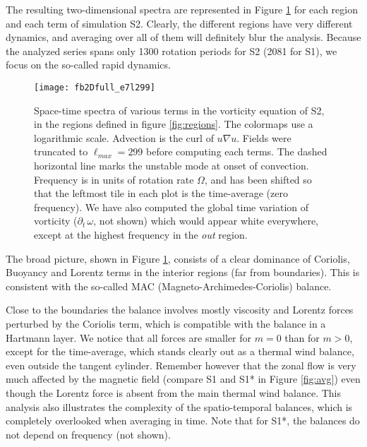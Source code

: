 \documentclass[12pt, a4paper]{article}
\begin{document}
The resulting two-dimensional spectra are represented in Figure \ref{fig:fb2d_S2} for each region and each term of simulation S2. 
Clearly, the different regions have very different dynamics, and averaging over all of them will definitely blur the analysis.
Because the analyzed series spans only 1300 rotation periods for S2 (2081 for S1), we focus on the so-called rapid dynamics.

\begin{figure}
\begin{center}
\texttt{[image: fb2Dfull\_e7l299]}
\caption{Space-time spectra of various terms in the vorticity equation of S2, in the regions defined in figure \ref{fig:regions}.
The colormaps use a logarithmic scale.
Advection is the curl of $u\nabla u$.
Fields were truncated to $\ell_{max}=299$ before computing each terms.
The dashed horizontal line marks the unstable mode at onset of convection.
Frequency is in units of rotation rate $\Omega$, and has been shifted so that the leftmost tile in each plot is the time-average (zero frequency).
We have also computed the global time variation of vorticity ($\partial_t\, \omega$, not shown) which would appear white everywhere, except at the highest frequency in the \textit{out} region.
}
\label{fig:fb2d_S2}
\end{center}
\end{figure}


The broad picture, shown in Figure \ref{fig:fb2d_S2}, consists of a clear dominance of Coriolis, Buoyancy and Lorentz terms in the interior regions (far from boundaries).
This is consistent with the so-called MAC (Magneto-Archimedes-Coriolis) balance.

Close to the boundaries the balance involves mostly viscosity and Lorentz forces perturbed by the Coriolis term, which is compatible with the balance in a Hartmann layer.
We notice that all forces are smaller for $m=0$ than for $m>0$, except for the time-average, which stands clearly out as a thermal wind balance, even outside the tangent cylinder.
Remember however that the zonal flow is very much affected by the magnetic field (compare S1 and S1* in Figure \ref{fig:avg}) even though the Lorentz force is absent from the main thermal wind balance.
This analysis also illustrates the complexity of the spatio-temporal balances, which is completely overlooked when averaging in time.
Note that for S1*, the balances do not depend on frequency (not shown).
\end{document}
